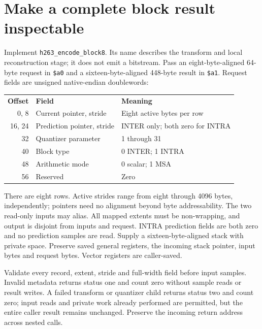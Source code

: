 \section{Make a complete block result inspectable}
Implement \texttt{h263\_encode\_block8}. Its name describes the transform and
local reconstruction stage; it does not emit a bitstream. Pass an eight-byte-aligned
64-byte request in \texttt{\$a0} and a sixteen-byte-aligned 448-byte result in
\texttt{\$a1}. Request fields are unsigned native-endian doublewords:
\begin{center}
  \begin{tabular}{rll}
    \textbf{Offset} & \textbf{Field}             & \textbf{Meaning}                \\
    0, 8            & Current pointer, stride    & Eight active bytes per row      \\
    16, 24          & Prediction pointer, stride & INTER only; both zero for INTRA \\
    32              & Quantizer parameter        & 1 through 31                    \\
    40              & Block type                 & 0 INTER; 1 INTRA                \\
    48              & Arithmetic mode            & 0 scalar; 1 MSA                 \\
    56              & Reserved                   & Zero
  \end{tabular}
\end{center}
There are eight rows. Active strides range from eight through 4096 bytes,
independently; pointers need no alignment beyond byte addressability. The two
read-only inputs may alias. All mapped extents must be non-wrapping, and output
is disjoint from inputs and request. INTRA prediction fields are both zero and
no prediction samples are read. Supply a sixteen-byte-aligned stack with private
space. Preserve saved general registers, the incoming stack pointer, input bytes
and request bytes. Vector registers are caller-saved.

Validate every record, extent, stride and full-width field before input samples.
Invalid metadata returns status one and count zero without sample reads or result
writes. A failed transform or quantizer child returns status two and count zero;
input reads and private work already performed are permitted, but the entire
caller result remains unchanged. Preserve the incoming return address across
nested calls.

